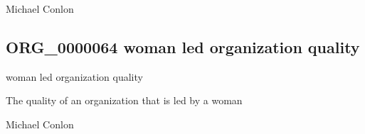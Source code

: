 \documentclass[letterpaper,10pt,english]{sphinxmanual}
\begin{document}
\begin{sphinxShadowBox}

\sphinxAtStartPar
Michael Conlon 
\end{sphinxShadowBox}

\begin{sphinxShadowBox}

\sphinxAtStartPar
{}
\end{sphinxShadowBox}
\begin{quote}

\ignorespaces \end{quote}


\subsection{ORG\_0000064 \sphinxhyphen{} woman led organization quality}
\label{\detokenize{doc-ORG_0000064:org-0000064-woman-led-organization-quality}}\label{\detokenize{doc-ORG_0000064:index-0}}\label{\detokenize{doc-ORG_0000064::doc}}
\begin{sphinxShadowBox}

\sphinxAtStartPar
woman led organization quality
\end{sphinxShadowBox}

\begin{sphinxShadowBox}

\sphinxAtStartPar
{\hyperref[\detokenize{doc-BFO_0000019::doc}]{}}
\end{sphinxShadowBox}

\begin{sphinxShadowBox}

\sphinxAtStartPar
The quality of an organization that is led by a woman
\end{sphinxShadowBox}

\begin{sphinxShadowBox}

\sphinxAtStartPar
Michael Conlon 
\end{sphinxShadowBox}
\end{document}
